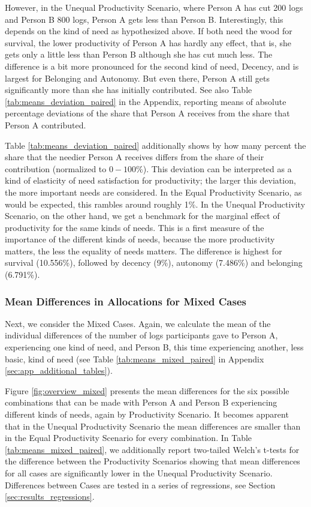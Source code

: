 \documentclass[egregdoesnotlikesansseriftitles]{scrartcl}
\begin{document}
However, in the Unequal Productivity Scenario, where Person A has cut 200 logs and Person B 800 logs, Person A gets less than Person B.
Interestingly, this depends on the kind of need as hypothesized above.
If both need the wood for survival, the lower productivity of Person A has hardly any effect, that is, she gets only a little less than Person B although she has cut much less.
The difference is a bit more pronounced for the second kind of need, Decency, and is largest for Belonging and Autonomy.
But even there, Person A still gets significantly more than she has initially contributed.
See also Table \ref{tab:means_deviation_paired} in the Appendix, reporting means of absolute percentage deviations of the share that Person A receives from the share that Person A contributed.

Table \ref{tab:means_deviation_paired} additionally shows by how many percent the share that the needier Person A receives differs from the share of their contribution (normalized to $0-100\%$).
This deviation can be interpreted as a kind of elasticity of need satisfaction for productivity; the larger this deviation, the more important needs are considered.
In the Equal Productivity Scenario, as would be expected, this rambles around roughly 1\%.
In the Unequal Productivity Scenario, on the other hand, we get a benchmark for the marginal effect of productivity for the same kinds of needs.
This is a first measure of the importance of the different kinds of needs, because the more productivity matters, the less the equality of needs matters.
The difference is highest for survival (10.556\%), followed by decency (9\%), autonomy (7.486\%) and belonging (6.791\%).


\subsubsection{Mean Differences in Allocations for Mixed Cases}\label{sec:results_mean_mixed}
Next, we consider the Mixed Cases.
Again, we calculate the mean of the individual differences of the number of logs participants gave to Person A, experiencing one kind of need, and Person B, this time experiencing another, less basic, kind of need (see Table \ref{tab:means_mixed_paired} in Appendix \ref{sec:app_additional_tables}).

Figure \ref{fig:overview_mixed} presents the mean differences for the six possible combinations that can be made with Person A and Person B experiencing different kinds of needs, again by Productivity Scenario.
It becomes apparent that in the Unequal Productivity Scenario the mean differences are smaller than in the Equal Productivity Scenario for every combination.
In Table \ref{tab:means_mixed_paired}, we additionally report two-tailed Welch's t-tests for the difference between the Productivity Scenarios showing that mean differences for all cases are significantly lower in the Unequal Productivity Scenario.
Differences between Cases are tested in a series of regressions, see Section \ref{sec:results_regressions}.
\end{document}
